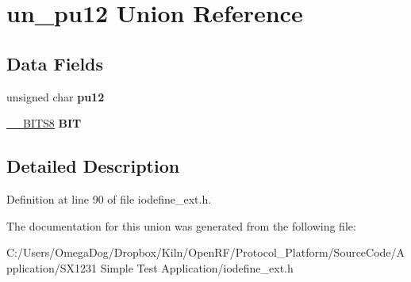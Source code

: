 \hypertarget{unionun__pu12}{\section{un\-\_\-pu12 Union Reference}
\label{unionun__pu12}
}
\subsection*{Data Fields}
\begin{DoxyCompactItemize}
\item 
\hypertarget{unionun__pu12_afbaa986f2b49d7edb2bd9222e5ee84ea}{unsigned char {\bfseries pu12}}\label{unionun__pu12_afbaa986f2b49d7edb2bd9222e5ee84ea}

\item 
\hypertarget{unionun__pu12_a5d2e0e9711da17f1767aa8c2833db5e5}{\hyperlink{struct_____b_i_t_s8}{\-\_\-\-\_\-\-B\-I\-T\-S8} {\bfseries B\-I\-T}}\label{unionun__pu12_a5d2e0e9711da17f1767aa8c2833db5e5}

\end{DoxyCompactItemize}


\subsection{Detailed Description}


Definition at line 90 of file iodefine\-\_\-ext.\-h.



The documentation for this union was generated from the following file\-:\begin{DoxyCompactItemize}
\item 
C\-:/\-Users/\-Omega\-Dog/\-Dropbox/\-Kiln/\-Open\-R\-F/\-Protocol\-\_\-\-Platform/\-Source\-Code/\-Application/\-S\-X1231 Simple Test Application/iodefine\-\_\-ext.\-h\end{DoxyCompactItemize}
